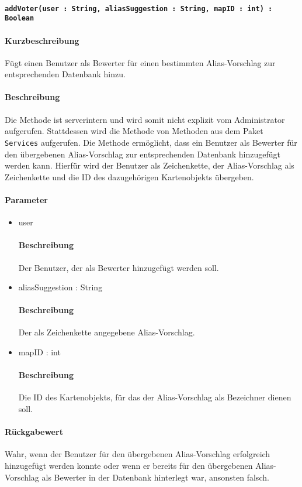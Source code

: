 \paragraph{\texttt{addVoter(user : String, aliasSuggestion : String, mapID : int) : Boolean}}%
\paragraph*{Kurzbeschreibung}
Fügt einen Benutzer als Bewerter für einen bestimmten Alias-Vorschlag zur entsprechenden Datenbank hinzu.
\paragraph*{Beschreibung}
Die Methode ist serverintern und wird somit nicht explizit vom Administrator aufgerufen.
Stattdessen wird die Methode von Methoden aus dem Paket \texttt{Services} aufgerufen.
Die Methode ermöglicht, dass ein Benutzer als Bewerter für den übergebenen Alias-Vorschlag zur entsprechenden Datenbank hinzugefügt werden kann.
Hierfür wird der Benutzer als Zeichenkette, der Alias-Vorschlag als Zeichenkette und die ID des dazugehörigen Kartenobjekts übergeben.
\paragraph*{Parameter}
\begin{itemize}
	\item user
		\paragraph*{Beschreibung}
		Der Benutzer, der als Bewerter hinzugefügt werden soll.
    \item aliasSuggestion : String
    		\paragraph*{Beschreibung}
    		Der als Zeichenkette angegebene Alias-Vorschlag.
    	\item mapID : int
    		\paragraph*{Beschreibung}
    		Die ID des Kartenobjekts, für das der Alias-Vorschlag als Bezeichner dienen soll.
\end{itemize}
\paragraph*{Rückgabewert}
Wahr, wenn der Benutzer für den übergebenen Alias-Vorschlag erfolgreich hinzugefügt werden konnte oder wenn er bereits für den übergebenen Alias-Vorschlag als Bewerter in der Datenbank hinterlegt war, ansonsten falsch.
